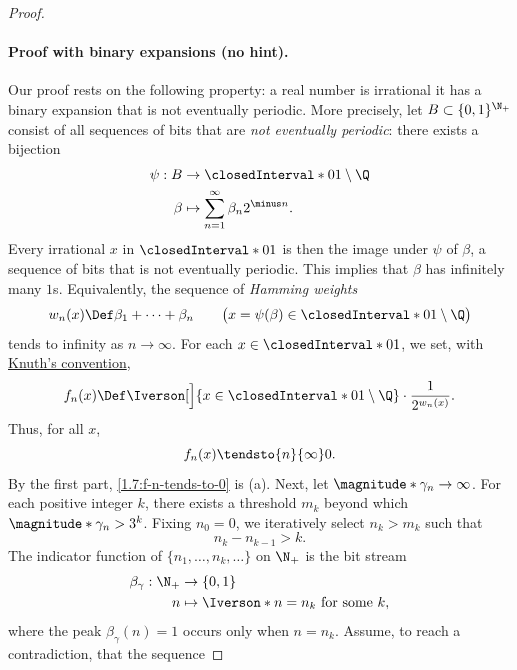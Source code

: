 \begin{proof}
\paragraph{Proof with binary expansions (no hint).} 
Our proof rests on the following property: a real number is irrational \IFF it has a binary expansion that is %
not eventually periodic. More precisely, let $B \subset \{0, 1\}^{\N_+}$ consist of all sequences of bits that are %
\emph{not eventually periodic}: there exists a bijection
%  
\begin{align} 
  \psi: B &\to \closedInterval*{0}{1} \setminus \Q \\
  \beta &\mapsto \sum_{n=1}^\infty \beta_n 2^{\minus n}. \nonumber
\end{align}
%
Every irrational $x$ in $\closedInterval*{0}{1}$ is then the image under $\psi$ of $\beta$, a sequence of bits that is not %
eventually periodic. This implies that $\beta$ has infinitely many $1$s. Equivalently, the sequence of \emph{Hamming weights} 
%
\begin{equation}
  w_n(x) \Def \beta_1 + \cdots + \beta_n %
  \qquad \bigl(x = \psi(\beta) \in \closedInterval*{0}{1} \setminus \Q \bigr)
\end{equation}
%
tends to infinity as $n \to \infty$. For each $x \in \closedInterval*{0}{1}$, we set, with %
\hyperref[Iverson-notation]{Knuth's convention},
%
\begin{equation}\label{1.7:definition-of-f-n}
  f_n(x) \Def \Iverson[\Big]{x \in \closedInterval*{0}{1} \setminus \Q} \cdot \frac{1}{2^{w_n(x)}}.
\end{equation}
%
Thus, for all $x$,
%
\begin{equation}\label{1.7:f-n-tends-to-0}
  f_n(x) \tendsto{n}{\infty} 0. 
\end{equation}
%
By the first part, \eqref{1.7:f-n-tends-to-0} is (a). Next, let $\magnitude*{\gamma_n} \to \infty$. For each positive integer %
$k$, there exists a threshold $m_k$ beyond which $\magnitude*{\gamma_n} > 3^k$. Fixing $n_0 = 0$, we iteratively select %
$n_k > m_k$ such that
%
\begin{equation}
  n_{k} - n_{k-1} > k.
\end{equation}
%
The indicator function of $\{n_1, \dots, n_k, \dots\}$ on $\N_+$ is the bit stream   
%  
\begin{align} 
  \beta_\gamma: \N_+ &\to \{0, 1\} \\
    n &\mapsto  \Iverson*{\text{$n = n_k$ for some $k$}}, \nonumber
\end{align}
%
where the peak $\beta_\gamma(n) = 1$ occurs only when $n = n_k$. Assume, to reach a contradiction, that the sequence %

\end{proof}
